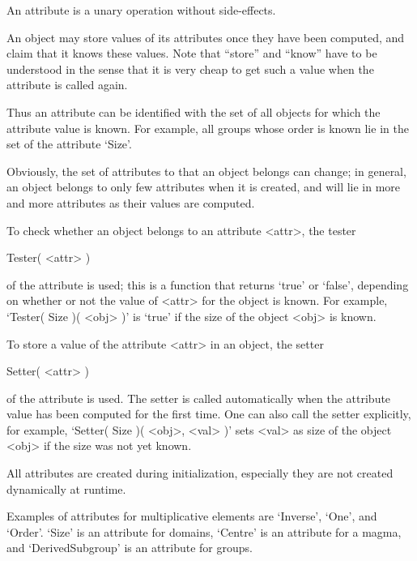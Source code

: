 An attribute is a unary operation without side-effects.

An object may store values of its attributes once they have been
computed, and claim that it knows these values.
Note that ``store'' and ``know'' have to be understood in the sense that 
it is very cheap to get such a value when the attribute is called again.


Thus an attribute can be identified with the set of all objects for which
the attribute value is known.
For example, all groups whose order is known lie in the set of the
attribute `Size'.

Obviously, the set of attributes to that an object belongs can change;
in general, an object belongs to only few attributes when it is created,
and will lie in more and more attributes as their values are computed.

To check whether an object belongs to an attribute <attr>,
the tester

\>Tester( <attr> )

of the attribute is used;
this is a function that returns `true' or `false',
depending on whether or not the value of <attr> for the object is known.
For example, `Tester( Size )( <obj> )' is `true' if the size of the object
<obj> is known.


To store a value of the attribute <attr> in an object,
the setter

\>Setter( <attr> )

of the attribute is used.
The setter is called automatically when the attribute value has been
computed for the first time.
One can also call the setter explicitly,
for example, `Setter( Size )( <obj>, <val> )' sets <val> as size of the
object <obj> if the size was not yet known.

All attributes are created during initialization,
especially they are not created dynamically at runtime.

Examples of attributes for multiplicative elements are `Inverse', `One',
and `Order'.
`Size' is an attribute for domains, `Centre' is an attribute for a magma,
and `DerivedSubgroup' is an attribute for groups.


